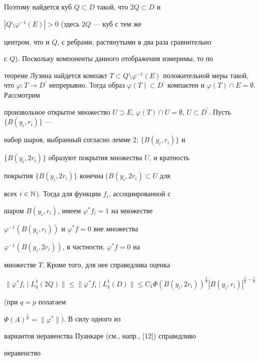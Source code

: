 \begin{pf}
Поэтому найдется куб $Q\subset D$ такой, что $2Q\subset D$ и


$|Q\setminus\varphi^{-1}(E)|>0$ (здесь $2Q$ --- куб с тем же


центром, что и $Q$, с ребрами, растянутыми в два раза сравнительно


с $Q$). Поскольку компоненты данного отображения измеримы, то по


теореме Лузина найдется компакт $T\subset


Q\setminus\varphi^{-1}(E)$ положительной меры такой, что $\varphi


: T\to D^{\prime}$ непрерывно. Тогда образ $\varphi(T)\subset


D^{\prime}$ компактен и $\varphi(T)\cap E=\emptyset$. Рассмотрим


произвольное открытое множество $U\supset E$, $\varphi(T)\cap


U=\emptyset$, $U\subset D^{\prime}$. Пусть $\{B(y_i,r_i)\}$ ---


набор шаров, выбранный согласно лемме 2; $\{B(y_i,r_i)\}$ и


$\{B(y_i,2r_i)\}$ образуют покрытия множества $U$, и кратность


покрытия $\{B(y_i,2r_i)\}$ конечна ($B(y_i,2r_i)\subset U$ для


всех $i\in{\Bbb N}$). Тогда для функции $f_i$, ассоциированной с


шаром $B(y_i,r_i)$, имеем $\varphi^{\ast}f_i=1$ на множестве


$\varphi^{-1}(B(y_i,r_i))$ и $\varphi^{\ast}f=0$ вне множества


$\varphi^{-1}(B(y_i,2r_i))$, в частности, $\varphi^{\ast}f=0$ на


множестве $T$. Кроме того, для нее справедлива оценка


$$


\|\varphi^{\ast}f_i\mid L^1_q(2Q)\|\leq


\|\varphi^{\ast}f_i\mid L^1_q(D)\| \leq


C_1{\Phi(B(y_i,2r_i))}^{\frac{1}{\sigma}} |B(y_i,r_i)|^{\frac{1}{p} -


\frac{1}{n}}


$$


(при $q=p$ полагаем


$\Phi(A)^{\frac{1}{\sigma}}=\|\varphi^*\|$). В силу одного из


вариантов неравенства Пуанкаре (см., напр., [12]) справедливо


неравенство



\end{pf}
